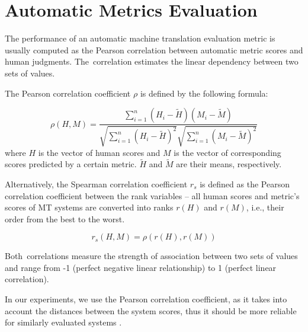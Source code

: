 \section{Automatic Metrics Evaluation}
The performance of an automatic machine translation evaluation metric is usually computed as the Pearson correlation between automatic metric scores and human judgments. The~correlation estimates the linear dependency between two sets of values.

The Pearson correlation coefficient $\rho$ is defined by the following formula:

\begin{equation*}
\rho(H,M) = \frac{ \sum_{i=1}^{n}{(H_i - \tilde{H})(M_i - \tilde{M})}}{ \sqrt{ \sum_{i=1}^{n}{(H_i - \tilde{H})^2} }  \sqrt{ \sum_{i=1}^{n}{(M_i - \tilde{M})^2} } } 
\end{equation*}
where $H$ is the vector of human scores and $M$ is the vector of corresponding scores predicted by a certain metric. $\tilde{H}$ and $\tilde{M}$ are their means, respectively. 

Alternatively, the Spearman correlation coefficient $r_{s} $ is defined as the Pearson correlation coefficient between the rank variables -- all human scores and  metric’s scores of MT systems are converted into ranks $r(H)$ and $r(M)$, i.e., their order from the best to the worst.

\begin{equation*}
r_{s}(H,M) = \rho(r(H),r(M))
\end{equation*}

Both~correlations measure the strength of association between two sets of values and range from -1 (perfect negative linear relationship) to 1 (perfect linear correlation). 

In our experiments, we use the Pearson correlation coefficient, as it takes into account the distances between the system scores, thus it should be more reliable for similarly evaluated systems \citep{machacek-bojar-2014-results}. 

%
%
%
